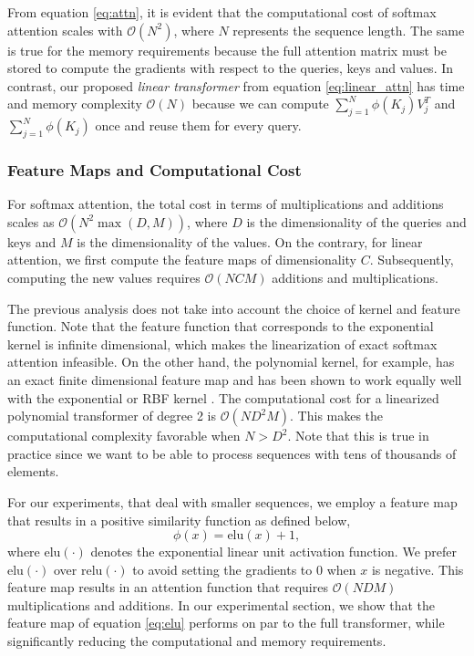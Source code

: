 \documentclass{article}
\newcommand{\linear}{\emph{linear transformer}}
\newcommand{\bigO}[1]{\mathcal{O}\left(#1\right)}
\newcommand{\fe}[1]{\phi\left(#1\right)}
\begin{document}
From equation \ref{eq:attn}, it is evident that the computational cost of
softmax attention scales with $\bigO{N^2}$, where $N$ represents the sequence
length. The same is true for the memory requirements because the full attention
matrix must be stored to compute the gradients with respect to the queries,
keys and values.
In contrast, our proposed \linear{} from equation \ref{eq:linear_attn} has
time and memory complexity $\bigO{N}$ because we can compute $\sum_{j=1}^N
\fe{K_j} V_j^T$ and $\sum_{j=1}^N \fe{K_j}$ once and reuse them for every
query.

\subsubsection{Feature Maps and Computational Cost} \label{sec:fmap}

For softmax attention, the total cost in terms of multiplications and
additions scales as $\bigO{N^2 \max\left(D, M\right)}$, where $D$ is the
dimensionality of the queries and keys and $M$ is the dimensionality of the
values. On the contrary, for linear attention, we first compute the feature
maps of dimensionality $C$. Subsequently, computing the new values requires
$\bigO{N C M}$ additions and multiplications.

The previous analysis does not take into account the choice of kernel and
feature function. Note that the feature function that corresponds to the
exponential kernel is infinite dimensional, which makes the linearization of
exact softmax attention infeasible. On the other hand, the polynomial kernel,
for example, has an exact finite dimensional feature map and has been shown to
work equally well with the exponential or RBF kernel
\cite{tsai2019transformer}. The computational cost for a linearized polynomial
transformer of degree 2 is $\bigO{N D^2 M}$. This makes the computational
complexity favorable when $N > D^2$. Note that this is true in practice since
we want to be able to process sequences with tens of thousands of elements.

For our experiments, that deal with smaller sequences, we employ a feature map
that results in a positive similarity function as defined below,
\begin{equation}
    \fe{x} = \text{elu}(x) + 1, \label{eq:elu}
\end{equation}
where $\text{elu}(\cdot)$ denotes the exponential linear unit
\cite{clevert2015fast} activation function. We prefer $\text{elu}(\cdot)$ over
$\text{relu}(\cdot)$ to avoid setting the gradients to 0 when $x$ is negative.
This feature map results in an attention function that requires $\bigO{N D M}$
multiplications and additions. In our experimental section, we show that the
feature map of equation \ref{eq:elu} performs on par to the full transformer,
while significantly reducing the computational and memory requirements.
\end{document}
